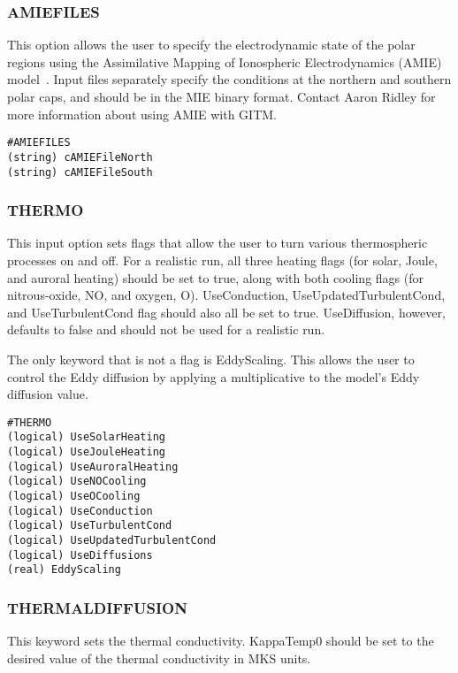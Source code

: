 \subsubsection{AMIEFILES}
\label{amiefiles.sec}

This option allows the user to specify the electrodynamic state of the polar regions using the Assimilative Mapping of Ionospheric Electrodynamics (AMIE) model~\citep{ridley:2004aa}.  Input files separately specify the conditions at the northern and southern polar caps, and should be in the MIE binary format.  Contact Aaron Ridley for more information about using AMIE with GITM.

\begin{verbatim}
#AMIEFILES
(string) cAMIEFileNorth 
(string) cAMIEFileSouth
\end{verbatim}

\subsubsection{THERMO}
\label{thermo.sec}

This input option sets flags that allow the user to turn various thermospheric processes on and off.  For a realistic run, all three heating flags (for solar, Joule, and auroral heating) should be set to true, along with both cooling flags (for nitrous-oxide, NO, and oxygen, O).  UseConduction, UseUpdatedTurbulentCond, and UseTurbulentCond flag should also all be set to true.  UseDiffusion, however, defaults to false and should not be used for a realistic run.

The only keyword that is not a flag is EddyScaling.  This allows the user to control the Eddy diffusion by applying a multiplicative to the model's Eddy diffusion value.

\begin{verbatim}
#THERMO
(logical) UseSolarHeating   
(logical) UseJouleHeating   
(logical) UseAuroralHeating
(logical) UseNOCooling    
(logical) UseOCooling       
(logical) UseConduction     
(logical) UseTurbulentCond  
(logical) UseUpdatedTurbulentCond
(logical) UseDiffusions
(real) EddyScaling  
\end{verbatim}

\subsubsection{THERMALDIFFUSION}
\label{thermaldiffusion.sec}

This keyword sets the thermal conductivity.  KappaTemp0 should be set to the desired value of the thermal conductivity in MKS units.

